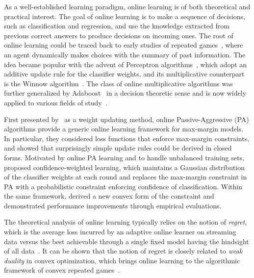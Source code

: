 \documentclass[twoside,11pt]{article}
\begin{document}
As a well-established learning paradigm, online learning is of both theoretical and practical interest. The goal of online learning is to make a sequence of decisions, such as classification and regression, and use the knowledge extracted from previous correct answers to produce decisions on incoming ones. The root of online learning could be traced back to early studies of repeated games~\citep{hannan1957approximation}, where an agent dynamically makes choices with the summary of past information. The idea became popular with the advent of Perceptron algorithms~\citep{rosenblatt1958perceptron}, which adopt an additive update rule for the classifier weights, and its multiplicative counterpart is the Winnow algorithm~\citep{littlestone1988learning}. The class of online multiplicative algorithms was further generalized by Adaboost~\citep{freund1997decision} in a decision theoretic sense and is now widely applied to various fields of study~\citep{arora2012multiplicative}.

First presented by~\citet{crammer2006pa} as a weight updating method, online Passive-Aggressive (PA) algorithms provide a generic online learning framework for max-margin models. In particular, they considered loss functions that enforce max-margin constraints, and showed that surprisingly simple update rules could be derived in closed forms. Motivated by online PA learning and to handle unbalanced training sets, \cite{dredze2008confidence} proposed confidence-weighted learning, which maintains a Gaussian distribution of the classifier weights at each round and replaces the max-margin constraint in PA with a probabilistic constraint enforcing confidence of classification. Within the same framework, \cite{pereira2008exact} derived a new convex form of the constraint and demonstrated performance improvements through empirical evaluations.

The theoretical analysis of online learning typically relies on the notion of \emph{regret}, which is the average loss incurred by an adaptive online learner on streaming data versus the best achievable through a single fixed model having the hindsight of all data~\citep{murphy2012machine_reget}. It can be shown that the notion of regret is closely related to \emph{weak duality} in convex optimization, which brings online learning to the algorithmic framework of convex repeated games~\citep{shalev2006convex}.
\end{document}
